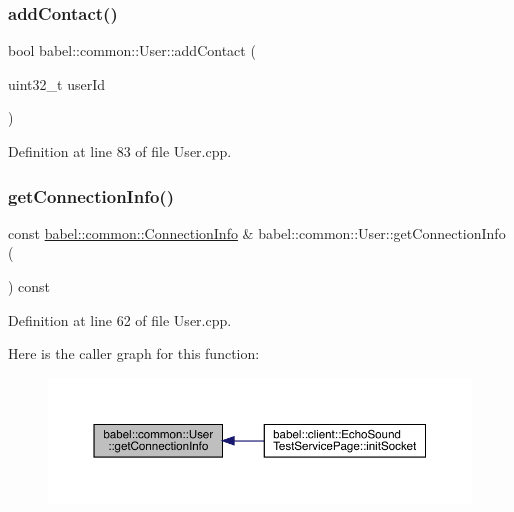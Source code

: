 \subsubsection{\texorpdfstring{add\+Contact()}{addContact()}}
{\footnotesize\ttfamily bool babel\+::common\+::\+User\+::add\+Contact (\begin{DoxyParamCaption}\item[{uint32\+\_\+t}]{user\+Id }\end{DoxyParamCaption})}



Definition at line 83 of file User.\+cpp.

\mbox{\label{classbabel_1_1common_1_1_user_a6dcd5d99ec1d1a789f71711c2601bef2}} 
\subsubsection{\texorpdfstring{get\+Connection\+Info()}{getConnectionInfo()}}
{\footnotesize\ttfamily const \mbox{\hyperlink{classbabel_1_1common_1_1_connection_info}{babel\+::common\+::\+Connection\+Info}} \& babel\+::common\+::\+User\+::get\+Connection\+Info (\begin{DoxyParamCaption}{ }\end{DoxyParamCaption}) const}



Definition at line 62 of file User.\+cpp.

Here is the caller graph for this function\+:\nopagebreak
\begin{figure}[H]
\begin{center}
\leavevmode
\includegraphics[width=350pt]{classbabel_1_1common_1_1_user_a6dcd5d99ec1d1a789f71711c2601bef2_icgraph}
\end{center}
\end{figure}
\mbox{\label{classbabel_1_1common_1_1_user_a2765d87c14df492dddcffb1af2a85649}} 
